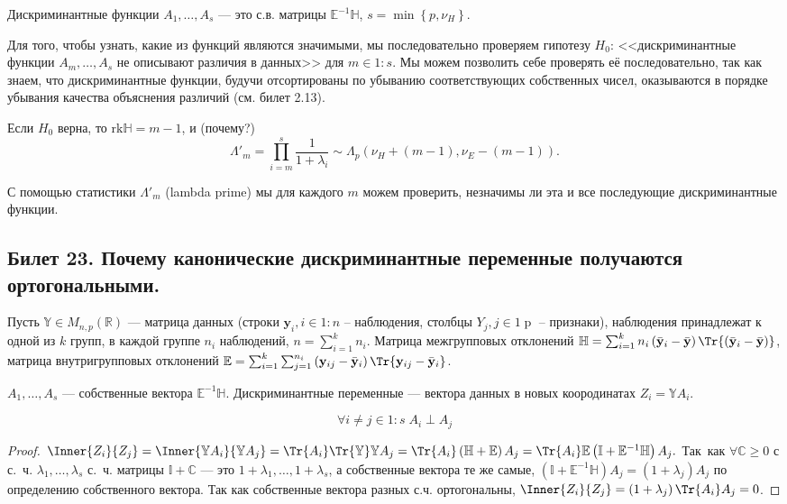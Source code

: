 	Дискриминантные функции $A_1, \ldots, A_s$ --- это с.в. матрицы $\mathbb E^{-1} \mathbb H$, $s = \min\left\lbrace p, \nu_H \right\rbrace$.

	Для того, чтобы узнать, какие из функций являются значимыми, мы последовательно проверяем гипотезу $H_0$: <<дискриминантные функции $A_m, \ldots, A_s$ не описывают различия в данных>> для $m\in 1\mathbin : s$.  Мы можем позволить себе проверять её последовательно, так как знаем, что дискриминантные функции, будучи отсортированы по убыванию соответствующих собственных чисел, оказываются в порядке убывания качества объяснения различий (см. билет 2.13).

	Если $H_0$ верна, то $\mathrm{rk}\mathbb H = m - 1$, и (почему?) $$\Lambda'_m = \prod_{i=m}^s \frac{1}{1+\lambda_i} \sim \Lambda_p\left(\nu_H + (m-1), \nu_E - (m-1)\right).$$

	С помощью статистики $\Lambda'_m$ (lambda prime) мы для каждого $m$ можем проверить, незначимы ли эта и все последующие дискриминантные функции.

\subsection{Билет 23. Почему канонические дискриминантные переменные получаются ортогональными.}
	Пусть $\mathbb Y \in M_{n, p}\left(\mathbb R\right)$ --- матрица данных (строки $\mathbf y_i, i \in 1\mathbin : n$ -- наблюдения, столбцы $Y_j, j\in 1\mathbin p$ -- признаки), 
	наблюдения принадлежат к одной из $k$ групп, 
	в каждой группе $n_i$ наблюдений, $n = \sum_{i=1}^k n_i$. %
	Матрица межгрупповых отклонений $\mathbb H = \sum_{i=1}^k n_i\left(\bar{\mathbf y}_i - \bar{\mathbf y}\right)\Tr{\left(\bar{\mathbf y}_i - \bar{\mathbf y}\right)}$, 
	матрица внутригрупповых отклонений $\mathbb E = \sum_{i=1}^k\sum_{j=1}^{n_i} \left(\mathbf y_{ij} - \bar{\mathbf y}_i\right)\Tr{\mathbf y_{ij} - \bar{\mathbf y}_i}$.

	$A_1, \ldots, A_s$ --- собственные вектора $\mathbb E^{-1}\mathbb H$. Дискриминантные переменные --- вектора данных в новых коородинатах $Z_i = \mathbb Y A_i$.

	\begin{thm}
		$$\forall i \neq j \in 1\mathbin : s\; A_i \perp A_j$$
	\end{thm}
	\begin{proof}
		$\Inner{Z_i}{Z_j} = \Inner{\mathbb Y A_i}{\mathbb Y A_j} = \Tr{A_i}\Tr{\mathbb Y}\mathbb Y A_j = \Tr{A_i}\left(\mathbb H + \mathbb E\right) A_j = \Tr{A_i}\mathbb E\left(\mathbb I + \mathbb E^{-1}\mathbb H\right) A_j.$ Так~как $\forall \mathbb C \geq 0$ с с.~ч. $\lambda_1, \ldots, \lambda_s$ с.~ч. матрицы $\mathbb I + \mathbb C$ --- это $1 + \lambda_1, \ldots, 1+ \lambda_s$, а собственные вектора те же самые, $\left(\mathbb I + \mathbb E^{-1}\mathbb H\right) A_j = \left(1 + \lambda_j\right) A_j$ по определению собственного вектора. Так как собственные вектора разных с.ч. ортогональны, $\Inner{Z_i}{Z_j} = \left(1+\lambda_j\right)\Tr{A_i} A_j = 0$.
	\end{proof}

